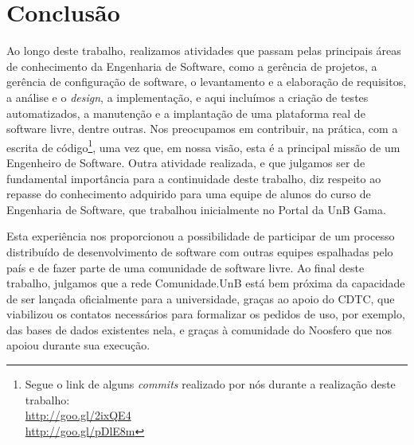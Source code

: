 \section{Conclusão}
\label{sec:conclusao}

Ao longo deste trabalho, realizamos atividades que passam
pelas principais áreas de conhecimento da Engenharia de Software, como a
gerência de projetos, a gerência de configuração de software,
o levantamento e a elaboração de requisitos, a análise e o \textit{design},
a implementação, e aqui incluímos a criação de testes automatizados,
a manutenção e a implantação de uma plataforma real de software livre, dentre
outras.
%
Nos preocupamos em contribuir, na prática, com a escrita de código\footnote{%
Segue o link de alguns \textit{commits} realizado por nós durante a realização
deste trabalho: \\
\url{http://goo.gl/2ixQE4}\\
\url{http://goo.gl/pDlE8m}},
uma vez que, em nossa visão, esta é a principal missão de um Engenheiro de
Software.
%
Outra atividade realizada, e que julgamos ser de fundamental importância para a
continuidade deste trabalho, diz respeito ao repasse do conhecimento adquirido
para uma equipe de alunos do curso de Engenharia de Software, que trabalhou
inicialmente no Portal da UnB Gama.

Esta experiência nos proporcionou a possibilidade de participar de um processo
distribuído de desenvolvimento de software com outras equipes espalhadas pelo
país e de fazer parte de uma comunidade de software livre.
%
Ao final deste trabalho, julgamos que a rede Comunidade.UnB está bem próxima
da capacidade de ser lançada oficialmente para a universidade, graças ao
apoio do CDTC, que viabilizou os contatos necessários para formalizar os
pedidos de uso, por exemplo, das bases de dados existentes nela, e graças
à comunidade do Noosfero que nos apoiou durante sua execução.

